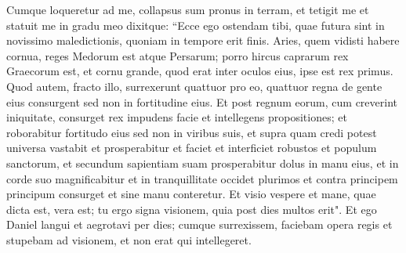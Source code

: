 \begin{biblechapter}
\verse Cumque loqueretur ad me, collapsus sum pronus in terram, et tetigit me et statuit me in gradu meo 
\verse dixitque: “Ecce ego ostendam tibi, quae futura sint in novissimo maledictionis, quoniam in tempore erit finis. 
\verse Aries, quem vidisti habere cornua, reges Medorum est atque Persarum; 
\verse porro hircus caprarum rex Graecorum est, et cornu grande, quod erat inter oculos eius, ipse est rex primus. 
\verse Quod autem, fracto illo, surrexerunt quattuor pro eo, quattuor regna de gente eius consurgent sed non in fortitudine eius.  
\verse Et post regnum eorum, cum creverint iniquitate, consurget rex impudens facie et intellegens propositiones; 
\verse et roborabitur fortitudo eius sed non in viribus suis, et supra quam credi potest universa vastabit et prosperabitur et faciet et interficiet robustos et populum sanctorum, 
\verse et secundum sapientiam suam prosperabitur dolus in manu eius, et in corde suo magnificabitur et in tranquillitate occidet plurimos et contra principem principum consurget et sine manu conteretur. 
\verse Et visio vespere et mane, quae dicta est, vera est; tu ergo signa visionem, quia post dies multos erit". 
\verse Et ego Daniel langui et aegrotavi per dies; cumque surrexissem, faciebam opera regis et stupebam ad visionem, et non erat qui intellegeret. 
\end{biblechapter}

